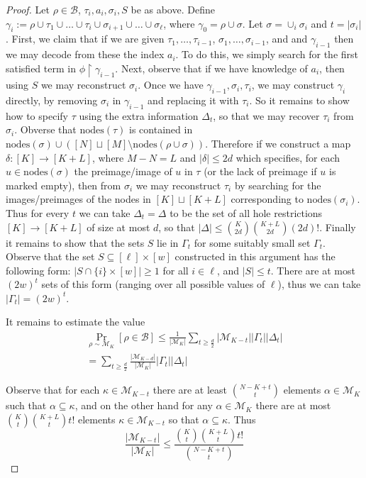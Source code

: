 \documentclass[11pt]{article}
\newcommand{\nodes}{\mathrm{nodes}}
\begin{document}
\begin{proof}
Let $\rho \in \mathcal{B}$, $\tau_i,a_i,\sigma_i, S$ be as above. Define $\gamma_{i}:=\rho \cup \tau_1 \cup \ldots \cup \tau_{i} \cup \sigma_{i+1} \cup \ldots \cup \sigma_{\ell}$, where $\gamma_0 = \rho \cup \sigma$. Let $\sigma=\cup_i\sigma_i$ and $t = |\sigma_i|$. First, we claim that if we are given $\tau_1,\ldots,\tau_{i-1}$, $\sigma_1,\ldots,\sigma_{i-1}$, and  and $\gamma_{i-1}$ then we may decode from these the index $a_i$. To do this, we simply search for the first satisfied term in $\phi \upharpoonright \gamma_{i-1}$. Next, observe that if we have knowledge of $a_i$, then using $S$ we may reconstruct $\sigma_i$. Once we have $\gamma_{i-1}, \sigma_i, \tau_i$, we may construct $\gamma_i$ directly, by removing $\sigma_i$ in $\gamma_{i-1}$ and replacing it with $\tau_i$. So it remains to show how to specify $\tau$ using the extra information $\Delta_t$, so that we may recover $\tau_i$ from $\sigma_i$. Obverse that $\nodes(\tau)$ is contained in $\nodes(\sigma) \cup ([N] \sqcup [M] \setminus \nodes(\rho \cup \sigma))$. Therefore if we construct a map $\delta: [K] \to [K + L]$, where $M-N=L$ and $|\delta| \leq 2d$ which specifies, for each $u \in \nodes(\sigma)$ the preimage/image of $u$ in $\tau$ (or the lack of preimage if $u$ is marked empty), then from $\sigma_i$ we may reconstruct $\tau_i$ by searching for the images/preimages of the nodes in $[K] \sqcup [K+L]$ corresponding to $\nodes(\sigma_i)$. Thus for every $t$ we can take $\Delta_t = \Delta$ to be the set of all hole restrictions $[K] \to [K+L]$ of size at most $d$, so that $|\Delta| \leq \binom{K}{2d}\binom{K+L}{2d}(2d)!$. Finally it remains to show that the sets $S$ lie in $\Gamma_t$ for some suitably small set $\Gamma_t$. Observe that the set $S \subseteq [\ell] \times [w]$ constructed in this argument has the following form: $|S \cap \{i\} \times [w]| \geq 1$ for all $i \in \ell$, and $|S| \leq t$. There are at most $(2w)^t$ sets of this form (ranging over all possible values of $\ell$), thus we can take $|\Gamma_t|= (2w)^t$.

It remains to estimate the value
\begin{gather*}
\Pr_{\rho \sim \mathcal{M}_{K}}[\rho \in \mathcal{B}] \leq \frac{1}{|\mathcal{M}_K|} \sum\limits_{t \geq \frac{d}{2}} |\mathcal{M}_{K-t}| |\Gamma_t| |\Delta_t| \\
=
\sum\limits_{t \geq \frac{d}{2}} \frac{|\mathcal{M}_{K-d}|}{|\mathcal{M}_K|}  |\Gamma_t| |\Delta_t|
\end{gather*}

Observe that for each $\kappa \in \mathcal{M}_{K-t}$ there are at least $\binom{N-K+t}{t}$ elements $\alpha \in \mathcal{M}_{K}$ such that $\alpha \subseteq \kappa$, and on the other hand for any $\alpha \in \mathcal{M}_{K}$ there are at most $\binom{K}{t}\binom{K+L}{t}t!$ elements $\kappa \in \mathcal{M}_{K-t}$ so that $\alpha \subseteq \kappa$. Thus
\[
\frac{ |\mathcal{M}_{K-t}|}{|\mathcal{M}_K|} \leq \frac{\binom{K}{t}\binom{K+L}{t}t!}{\binom{N-K+t}{t}} 
\]


\end{proof}
\end{document}
